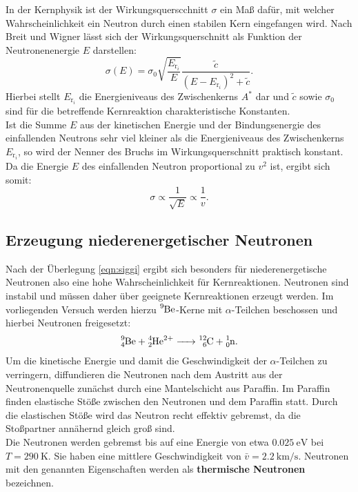 In der Kernphysik ist der Wirkungsquerscchnitt $\sigma$ ein Maß dafür, mit welcher Wahrscheinlichkeit ein Neutron durch einen stabilen Kern eingefangen wird.
Nach Breit und Wigner lässt sich der Wirkungsquerschnitt als Funktion der Neutronenenergie $E$ darstellen:
\begin{equation}
  \sigma (E)=\sigma _0 \sqrt{\frac{E_{\mathrm{r}_i}}{E}}\frac{\tilde{c}}{\left(E-E_{\mathrm{r}_i}\right)^2 +\tilde{c}} \text{.}
\end{equation}
Hierbei stellt $E_{\mathrm{r}_i}$ die Energieniveaus des Zwischenkerns $A^{*}$ dar und $\tilde{c}$ sowie $\sigma_0$ sind für die betreffende Kernreaktion charakteristische Konstanten.\\
Ist die Summe $E$ aus der kinetischen Energie und der Bindungsenergie des einfallenden Neutrons sehr viel kleiner als die Energieniveaus des Zwischenkerns $E_{\mathrm{r}_i}$, so wird der Nenner des Bruchs im Wirkungsquerschnitt praktisch konstant. Da die Energie $E$ des einfallenden Neutron proportional zu $v^2$ ist, ergibt sich somit:
\begin{equation}
  \label{eqn:siggi}
  \sigma \propto \frac{1}{\sqrt{E}}\propto \frac{1}{v} \text{.}
\end{equation}

\subsection{Erzeugung niederenergetischer Neutronen}
Nach der Überlegung \ref{eqn:siggi} ergibt sich besonders für niederenergetische Neutronen also eine hohe Wahrscheinlichkeit für Kernreaktionen.
Neutronen sind instabil und müssen daher über geeignete Kernreaktionen erzeugt werden.
Im vorliegenden Versuch werden hierzu $\ce{^{9}Be}$-Kerne mit $\alpha$-Teilchen beschossen und hierbei Neutronen freigesetzt:
\begin{align}
    \ce{ ^{9}_4Be + ^{4}_2He^{2+}  -> ^{12}_6C + ^{1}_0n}\text{.}
\end{align}
Um die kinetische Energie und damit die Geschwindigkeit der $\alpha$-Teilchen zu verringern, diffundieren die Neutronen nach dem Austritt aus der Neutronenquelle zunächst durch eine Mantelschicht aus Paraffin. Im Paraffin finden elastische Stöße zwischen den Neutronen und dem Paraffin statt. Durch die elastischen Stöße wird das Neutron recht effektiv gebremst, da die Stoßpartner annähernd gleich groß sind.\\
Die Neutronen werden gebremst bis auf eine Energie von etwa $\SI{0.025}{\electronvolt}$ bei $T=\SI{290}{\kelvin}$. Sie haben eine mittlere Geschwindigkeit von $\bar{v}=\SI{2.2}{\kilo\meter\per\second}$. Neutronen mit den genannten Eigenschaften werden als \textbf{thermische Neutronen} bezeichnen.

